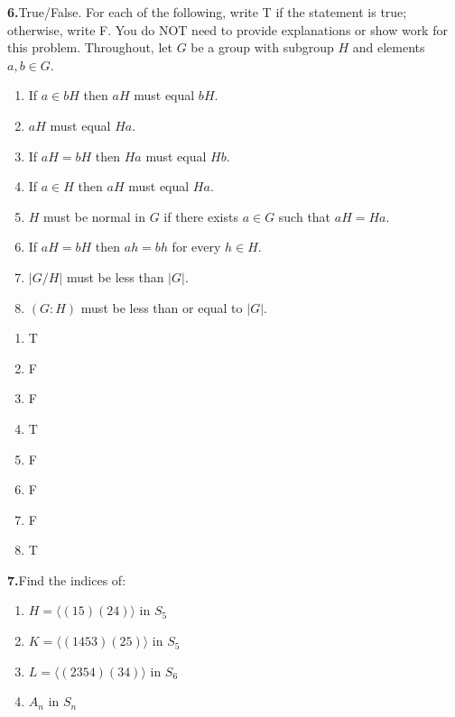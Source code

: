 \documentclass[10pt,]{book}
\theoremstyle{plain}
\theoremstyle{definition}
\theoremstyle{definition}
\theoremstyle{definition}
\theoremstyle{definition}
\numberwithin{equation}{section}
\begin{document}
%
\par\smallskip
\noindent\textbf{6.}\quad{}True/False. For each of the following, write T if the statement is true; otherwise, write F. You do NOT need to provide explanations or show work for this problem. Throughout, let \(G\) be a group with subgroup \(H\) and elements \(a,b\in G\). \leavevmode%
\begin{enumerate}[label=(\alph*)]
\item\hypertarget{li-453}{}If \(a\in bH\) then \(aH\) must equal \(bH\).%
\item\hypertarget{li-454}{}\(aH\) must equal \(Ha\).%
\item\hypertarget{li-455}{}If \(aH=bH\) then \(Ha\) must equal \(Hb\).%
\item\hypertarget{li-456}{}If \(a\in H\) then \(aH\) must equal \(Ha\).%
\item\hypertarget{li-457}{}\(H\) must be normal in \(G\) if there exists \(a\in G\) such that \(aH=Ha\).%
\item\hypertarget{li-458}{}If \(aH=bH\) then \(ah=bh\) for every \(h\in H\).%
\item\hypertarget{li-459}{}\(|G/H|\) must be less than \(|G|\).%
\item\hypertarget{li-460}{}\((G:H)\) must be less than or equal to \(|G|\).%
\end{enumerate}
%
\par\smallskip
\leavevmode%
\begin{multicols}{4}
\begin{enumerate}[label=(\alph*)]
\item\hypertarget{li-461}{}T%
\item\hypertarget{li-462}{}F%
\item\hypertarget{li-463}{}F%
\item\hypertarget{li-464}{}T%
\item\hypertarget{li-465}{}F%
\item\hypertarget{li-466}{}F%
\item\hypertarget{li-467}{}F%
\item\hypertarget{li-468}{}T%
\end{enumerate}
\end{multicols}
\par\smallskip
\noindent\textbf{7.}\quad{}Find the indices of: \leavevmode%
\begin{enumerate}[label=(\alph*)]
\item\hypertarget{li-469}{}\(H=\langle (15)(24)\rangle\) in \(S_5\)%
\item\hypertarget{li-470}{}\(K=\langle (1453)(25)\rangle\) in \(S_5\)%
\item\hypertarget{li-471}{}\(L=\langle (2354)(34)\rangle\) in \(S_6\)%
\item\hypertarget{li-472}{}\(A_n\) in \(S_n\)%
\end{enumerate}
\end{document}
